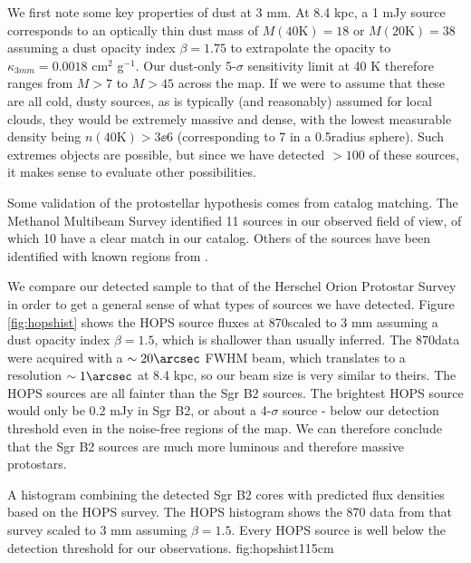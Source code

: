 \documentclass{emulateapj}
\begin{document}
We first note some key properties of dust at 3 mm.   At 8.4 kpc, a 1 mJy source
corresponds to an optically thin dust mass of $M(40\mathrm{K})=18$ \msun or
$M(20\mathrm{K})=38$ \msun assuming a dust opacity index $\beta=1.75$ to
extrapolate the \citet{Ossenkopf1994a} opacity to $\kappa_{3mm}=0.0018$ cm$^2$
g$^{-1}$.  Our dust-only 5-$\sigma$ sensitivity limit at 40 K therefore ranges
from $M>7$ \msun to $M>45$ \msun across the map.  If we were to assume that
these are all cold, dusty sources, as is typically (and reasonably) assumed for
local clouds, they would be extremely massive and dense, with the lowest
measurable density being $n(40\mathrm{K}) > 3\ee{6}$ \percc (corresponding to 7
\msun in a 0.5\arcsec radius sphere).  Such extremes objects are possible, but
since we have detected $>100$ of these sources, it makes sense to evaluate
other possibilities.



Some validation of the protostellar hypothesis comes from catalog matching.
The \citet{Caswell2010a} Methanol Multibeam Survey identified 11 sources in our
observed field of view, of which 10 have a clear match in our catalog.
Others of the sources have been identified with known \hii regions from
\citet{Gaume1995a}.


We compare our detected sample to that of the Herschel Orion Protostar Survey
\citep[HOPS;][]{Furlan2016a} in order to get a general sense of what types of
sources we have detected.  Figure \ref{fig:hopshist} shows the HOPS source
fluxes at 870\um scaled to 3 mm assuming a dust opacity index $\beta=1.5$,
which is shallower than usually inferred.  The 870\um data were acquired with a
$\sim20\arcsec$ FWHM beam, which translates to a resolution $\sim1\arcsec$ at
8.4 kpc, so our beam size is very similar to theirs.  The HOPS sources are all
fainter than the Sgr B2 sources.  The brightest HOPS source would only be 0.2
mJy in Sgr B2, or about a 4-$\sigma$ source - below our detection threshold
even in the noise-free regions of the map.  We can therefore conclude that
the Sgr B2 sources are much more luminous and therefore massive protostars.


{A histogram combining the detected Sgr B2 cores with predicted flux densities
based on the HOPS \citep{Furlan2016a} survey.  The HOPS histogram shows the 870
\um data from that survey scaled to 3 mm assuming $\beta=1.5$.  Every HOPS
source is well below the detection threshold for our observations.}
{fig:hopshist}{1}{15cm}
\end{document}
